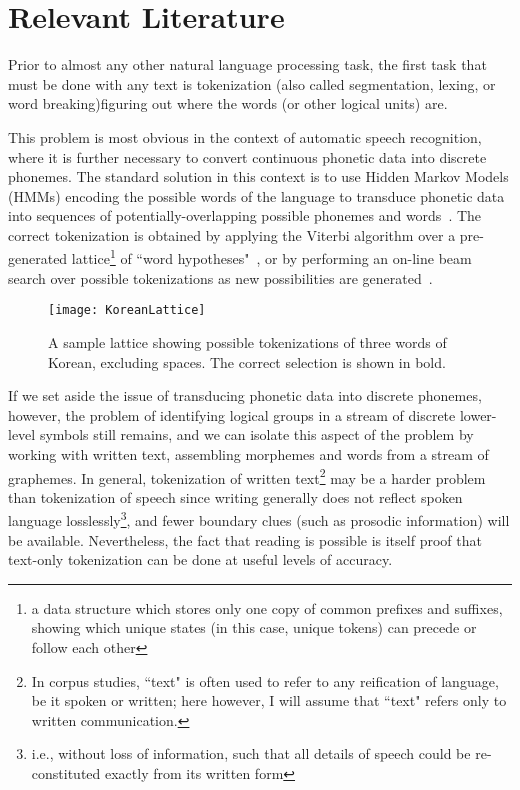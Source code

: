 \chapter{Relevant Literature}

Prior to almost any other natural language processing task, the first task that must be done with any text is tokenization (also called segmentation, lexing, or word breaking)\textemdash figuring out where the words (or other logical units) are. 

This problem is most obvious in the context of automatic speech recognition, where it is further necessary to convert continuous phonetic data into discrete phonemes. The standard solution in this context is to use Hidden Markov Models (HMMs) encoding the possible words of the language to transduce phonetic data into sequences of potentially-overlapping possible phonemes and words~\cite{cole97}. The correct tokenization is obtained by applying the Viterbi algorithm over a pre-generated lattice\footnote{a data structure which stores only one copy of common prefixes and suffixes, showing which unique states (in this case, unique tokens) can precede or follow each other} of ``word hypotheses"~\cite{aubert94}, or by performing an on-line beam search over possible tokenizations as new possibilities are generated~\cite{paul94}.

\begin{figure}
	\centering
	\texttt{[image: KoreanLattice]}
	\caption[Token Lattice]{A sample lattice showing possible tokenizations of three words of Korean, excluding spaces. The correct selection is shown in bold.}
	\label{latticediagram}
\end{figure}

If we set aside the issue of transducing phonetic data into discrete phonemes, however, the problem of identifying logical groups in a stream of discrete lower-level symbols still remains, and we can isolate this aspect of the problem by working with written text, assembling morphemes and words from a stream of graphemes. In general, tokenization of written text\footnote{In corpus studies, ``text" is often used to refer to any reification of language, be it spoken or written; here however, I will assume that ``text" refers only to written communication.} may be a harder problem than tokenization of speech since writing generally does not reflect spoken language losslessly\footnote{i.e., without loss of information, such that all details of speech could be re-constituted exactly from its written form}, and fewer boundary clues (such as prosodic information) will be available. Nevertheless, the fact that reading is possible is itself proof that text-only tokenization can be done at useful levels of accuracy.


